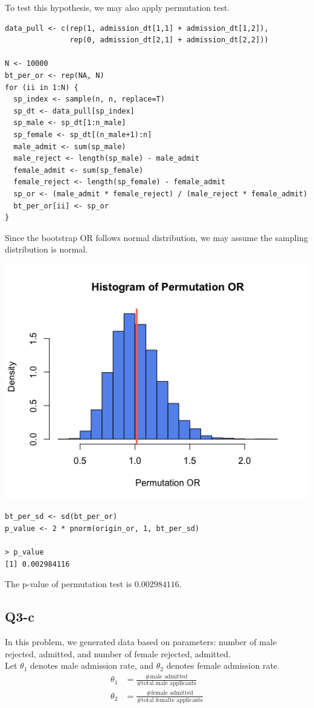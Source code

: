 \documentclass[12pt,letterpaper]{article}
\begin{document}
\noindent To test this hypothesis, we may also apply permutation test. 
\begin{verbatim}
data_pull <- c(rep(1, admission_dt[1,1] + admission_dt[1,2]), 
               rep(0, admission_dt[2,1] + admission_dt[2,2]))

N <- 10000
bt_per_or <- rep(NA, N)
for (ii in 1:N) {
  sp_index <- sample(n, n, replace=T)
  sp_dt <- data_pull[sp_index]
  sp_male <- sp_dt[1:n_male]
  sp_female <- sp_dt[(n_male+1):n]
  male_admit <- sum(sp_male)
  male_reject <- length(sp_male) - male_admit
  female_admit <- sum(sp_female)
  female_reject <- length(sp_female) - female_admit
  sp_or <- (male_admit * female_reject) / (male_reject * female_admit)
  bt_per_or[ii] <- sp_or
}
\end{verbatim}

\noindent Since the bootstrap OR follows normal distribution, we may assume the sampling distribution is normal. 

\includegraphics[width=150mm]{hist_per_or.png}

\begin{verbatim}
bt_per_sd <- sd(bt_per_or)
p_value <- 2 * pnorm(origin_or, 1, bt_per_sd)

> p_value
[1] 0.002984116
\end{verbatim}

\noindent The p-value of permutation test is $0.002984116$.

\newpage
\subsection*{Q3-c}
\noindent In this problem, we generated data based on parameters: number of male rejected, admitted, and number of female rejected, admitted. \\
\noindent Let $\theta_1$ denotes male admission rate, and $\theta_2$ denotes female admission rate. 
\begin{align*}
\theta_1 &= \frac{\# \text{male admitted}}{\# \text{total male applicants}} \\
\theta_2 &= \frac{\# \text{female admitted}}{\# \text{total femalte applicants}}
\end{align*}
\end{document}
